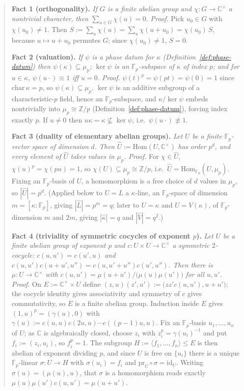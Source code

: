\begin{quote}
\textbf{Fact 1 (orthogonality).}\label{fact:orth} \emph{If $G$ is a finite
abelian group and $\chi:G\to\mathbb{C}^\times$ a nontrivial character, then
$\sum_{u\in G}\chi(u)=0$.}
\emph{Proof.} Pick $u_0\in G$ with $\chi(u_0)\neq 1$. Then
$S:=\sum_{u}\chi(u) = \sum_u\chi(u+u_0) = \chi(u_0)\,S$, because
$u\mapsto u+u_0$ permutes $G$; since $\chi(u_0)\neq 1$, $S=0$.

\textbf{Fact 2 (valuation).}\label{fact:val} \emph{If $\psi$ is a phase datum
for $\kappa$ (Definition~\ref{def:phase-datum}) then $\psi(\kappa)\subseteq\mu_p$;
$\ker\psi$ is an $\mathbb{F}_p$-subspace of $\kappa$ of index $p$; and for
$u\in\kappa$, $\psi(u\cdot)\equiv 1$ iff $u=0$.}
\emph{Proof.} $\psi(t)^p=\psi(pt)=\psi(0)=1$ since $\mathrm{char}\,\kappa=p$,
so $\psi(\kappa)\subseteq\mu_p$. $\ker\psi$ is an additive subgroup of a
characteristic-$p$ field, hence an $\mathbb{F}_p$-subspace, and
$\kappa/\ker\psi$ embeds nontrivially into $\mu_p\cong\mathbb{Z}/p$
(Definition~\ref{def:phase-datum}), forcing index exactly $p$. If $u\neq 0$
then $u\kappa=\kappa\not\subseteq\ker\psi$, i.e.\ $\psi(u\cdot)\not\equiv 1$.

\textbf{Fact 3 (duality of elementary abelian groups).}\label{fact:dual}
\emph{Let $U$ be a finite $\mathbb{F}_p$-vector space of dimension $d$. Then
$\hat U:=\mathrm{Hom}(U,\mathbb{C}^\times)$ has order $p^d$, and every element
of $\hat U$ takes values in $\mu_p$.}
\emph{Proof.} For $\chi\in\hat U$, $\chi(u)^p=\chi(pu)=1$, so
$\chi(U)\subseteq\mu_p\cong\mathbb{Z}/p$, i.e.\ $\hat U=\mathrm{Hom}_{\mathbb{F}_p}(U,\mu_p)$.
Fixing an $\mathbb{F}_p$-basis of $U$, a homomorphism is a free choice of $d$
values in $\mu_p$, so $|\hat U|=p^d$. (Applied below to $U=L$ a $\kappa$-line,
an $\mathbb{F}_p$-space of dimension $m=[\kappa:\mathbb{F}_p]$, giving
$|\hat L|=p^m=q$; later to $U=\kappa$ and $U=V(\kappa)$, of $\mathbb{F}_p$-dimension
$m$ and $2m$, giving $|\hat\kappa|=q$ and $|\hat V|=q^2$.)

\textbf{Fact 4 (triviality of symmetric cocycles of exponent $p$).}\label{fact:triv}
\emph{Let $U$ be a finite abelian group of exponent $p$ and
$c:U\times U\to\mathbb{C}^\times$ a symmetric $2$-cocycle: $c(u,u')=c(u',u)$
and $c(u,u')c(u+u',u'')=c(u,u'+u'')c(u',u'')$. Then there is
$\mu:U\to\mathbb{C}^\times$ with $c(u,u')=\mu(u+u')/\big(\mu(u)\mu(u')\big)$
for all $u,u'$.}
\emph{Proof.} On $E:=\mathbb{C}^\times\times U$ define
$(z,u)(z',u'):=\big(zz'c(u,u'),u+u'\big)$; the cocycle identity gives
associativity and symmetry of $c$ gives commutativity, so $E$ is a finite
abelian group. Induction inside $E$ gives $(1,u)^p=(\gamma(u),0)$ with
$\gamma(u):=c(u,u)c(2u,u)\cdots c((p{-}1)u,u)$. Fix an $\mathbb{F}_p$-basis
$u_1,\dots,u_n$ of $U$; as $\mathbb{C}$ is algebraically closed, choose $z_i$
with $z_i^p=\gamma(u_i)^{-1}$ and put $f_i:=(z_i,u_i)$, so $f_i^p=1$. The
subgroup $H:=\langle f_1,\dots,f_n\rangle\leq E$ is then abelian of exponent
dividing $p$, and since $U$ is free on $\{u_i\}$ there is a unique
$\mathbb{F}_p$-linear $\sigma:U\to H$ with $\sigma(u_i)=f_i$ and
$\mathrm{pr}_U\circ\sigma=\mathrm{id}_U$. Writing $\sigma(u)=(\mu(u),u)$, that
$\sigma$ is a homomorphism reads exactly
$\mu(u)\mu(u')c(u,u')=\mu(u+u')$.
\end{quote}

